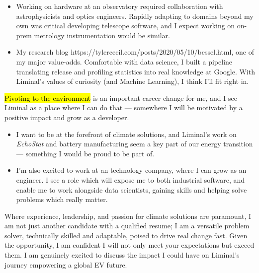 \documentclass{tc_cv}
\begin{document}
\begin{adjustwidth}{38pt}{38pt}
\begin{itemize}
    \item Working on hardware at an observatory required collaboration with
      astrophysicists and optics engineers. Rapidly adapting to domains beyond
      my own was critical developing telescope software, and I expect working
      on on-prem metrology instrumentation would be similar.

    \item My research blog \cite{dives into
      statistics}{https://tylercecil.com/posts/2020/05/10/bessel.html}, one of
      my major value-adds. Comfortable with data science, I built a pipeline
      translating release and profiling statistics into real knowledge at
      Google. With Liminal's values of curiosity (and Machine Learning), I
      think I'll fit right in.

  \end{itemize} \medskip

  \hl{Pivoting to the environment} is an important career change for me,
  and I see Liminal as a place where I can do that --- somewhere I will be
  motivated by a positive impact and grow as a developer.
  \begin{itemize}

    \item I want to be at the forefront of climate solutions, and Liminal's
      work on \emph{EchoStat} and battery manufacturing seem a key part of our
      energy transition --- something I would be proud to be part of.

    \item I'm also excited to work at an technology company, where I can grow
      as an engineer. I see a role which will expose me to both industrial
      software, and enable me to work alongside data scientists, gaining skills
      and helping solve problems which really matter.

  \end{itemize} \medskip

  Where experience, leadership, and passion for climate solutions are
  paramount, I am not just another candidate with a qualified resume; I am a
  versatile problem solver, technically skilled and adaptable, poised to drive
  real change fast. Given the opportunity, I am confident I will not only meet
  your expectations but exceed them. I am genuinely excited to discuss the
  impact I could have on Liminal's journey empowering a global EV future.



\end{adjustwidth}
\end{document}
